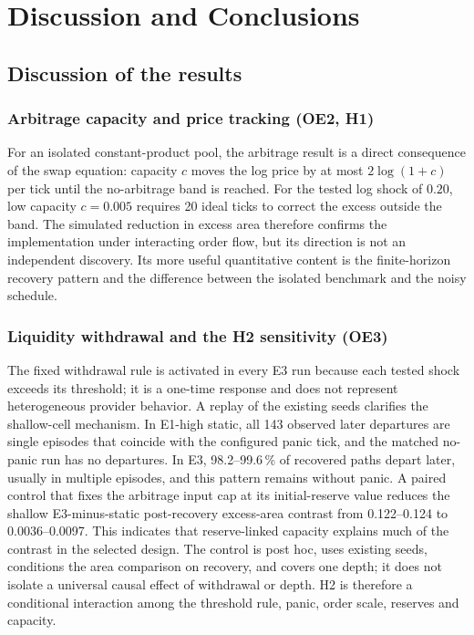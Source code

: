 \chapter{Discussion and Conclusions}
\label{cap:discusion}

\section{Discussion of the results}

\subsection{Arbitrage capacity and price tracking (OE2, H1)}

For an isolated constant-product pool, the arbitrage result is a direct consequence of the swap equation: capacity $c$ moves the log price by at most $2\log(1+c)$ per tick until the no-arbitrage band is reached. For the tested log shock of $0.20$, low capacity $c=0.005$ requires 20 ideal ticks to correct the excess outside the band. The simulated reduction in excess area therefore confirms the implementation under interacting order flow, but its direction is not an independent discovery. Its more useful quantitative content is the finite-horizon recovery pattern and the difference between the isolated benchmark and the noisy schedule.

\subsection{Liquidity withdrawal and the H2 sensitivity (OE3)}

The fixed withdrawal rule is activated in every E3 run because each tested shock exceeds its threshold; it is a one-time response and does not represent heterogeneous provider behavior. A replay of the existing seeds clarifies the shallow-cell mechanism. In E1-high static, all 143 observed later departures are single episodes that coincide with the configured panic tick, and the matched no-panic run has no departures. In E3, 98.2--99.6\,\% of recovered paths depart later, usually in multiple episodes, and this pattern remains without panic. A paired control that fixes the arbitrage input cap at its initial-reserve value reduces the shallow E3-minus-static post-recovery excess-area contrast from 0.122--0.124 to 0.0036--0.0097. This indicates that reserve-linked capacity explains much of the contrast in the selected design. The control is post hoc, uses existing seeds, conditions the area comparison on recovery, and covers one depth; it does not isolate a universal causal effect of withdrawal or depth. H2 is therefore a conditional interaction among the threshold rule, panic, order scale, reserves and capacity.

